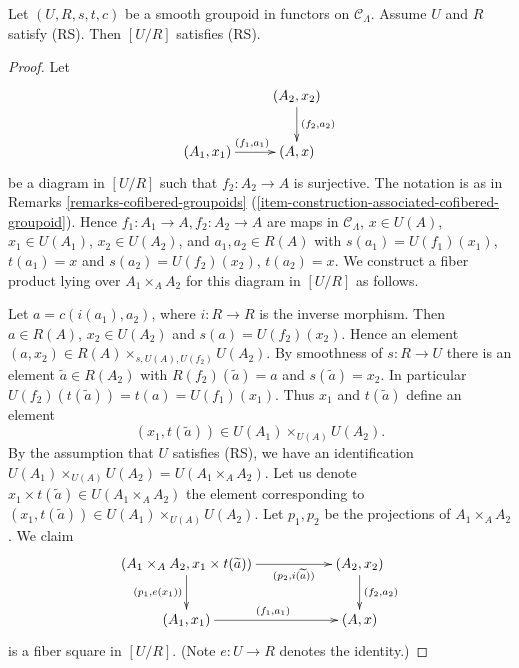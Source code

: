 \begin{lemma}
\label{lemma-smooth-RS-groupoid-in-functors-quotient}
Let $(U, R, s, t, c)$ be a smooth groupoid in functors on $\mathcal{C}_\Lambda$.
Assume $U$ and $R$ satisfy (RS). Then $[U/R]$ satisfies (RS).
\end{lemma}

\begin{proof}
Let
$$
\xymatrix{
                           &     (A_2, x_2) \ar[d]^{(f_2, a_2)} \\
(A_1, x_1) \ar[r]^{(f_1, a_1)} &     (A, x)
}
$$
be a diagram in $[U/R]$ such that $f_2: A_2 \to A$ is surjective. The
notation is as in
Remarks \ref{remarks-cofibered-groupoids}
(\ref{item-construction-associated-cofibered-groupoid}).
Hence $f_1: A_1 \to A, f_2: A_2 \to A$ are maps in
$\mathcal{C}_\Lambda$, $x \in U(A)$, $x_1 \in U(A_1)$, $x_2 \in U(A_2)$,
and $a_1, a_2 \in R(A)$ with $s(a_1) = U(f_1)(x_1)$,
$t(a_1) = x$ and $s(a_2) = U(f_2)(x_2)$, $t(a_2) = x$.
We construct a fiber product lying over $A_1 \times_A A_2$
for this diagram in $[U/R]$ as follows.

\medskip \noindent
Let $a = c(i(a_1), a_2)$, where $i: R \to R$ is the inverse morphism.
Then $a \in R(A)$, $x_2 \in U(A_2)$ and $s(a) = U(f_2)(x_2)$.
Hence an element $(a, x_2) \in R(A) \times_{s, U(A), U(f_2)} U(A_2)$.
By smoothness of $s : R \to U$ there is an element
$\widetilde{a} \in R(A_2)$ with $R(f_2)(\widetilde{a}) = a$ and
$s(\widetilde{a}) = x_2$. In particular
$U(f_2)(t(\widetilde{a})) = t(a) = U(f_1)(x_1)$. Thus $x_1$ and
$t(\widetilde{a})$ define an element
$$
(x_1, t(\widetilde{a})) \in U(A_1) \times_{U(A)} U(A_2).
$$
By the assumption that $U$ satisfies (RS), we have an identification
$U(A_1) \times_{U(A)} U(A_2) = U(A_1 \times_A A_2)$. Let us denote
$x_1 \times t(\widetilde{a}) \in U(A_1 \times_A A_2)$ the element
corresponding to $(x_1, t(\widetilde{a})) \in U(A_1) \times_{U(A)} U(A_2)$.
Let $p_1, p_2$ be the projections of $A_1 \times_A A_2$.  We claim
$$
\xymatrix{
(A_1 \times_A A_2, x_1 \times t(\widetilde{a})) \ar[d]_{(p_1, e(x_1))}
\ar[rr]_-{(p_2, i(\widetilde{a}))} & & (A_2, x_2) \ar[d]^{(f_2, a_2)} \\
(A_1, x_1) \ar[rr]^{(f_1, a_1)} && (A, x)
}
$$
is a fiber square in $[U/R]$. (Note $e: U \to R$ denotes the identity.)


\end{proof}
